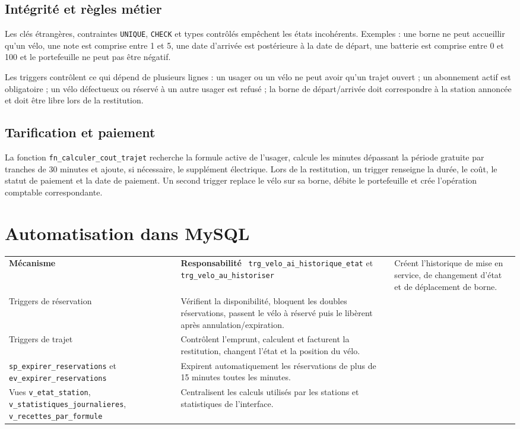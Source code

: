 \documentclass[11pt,a4paper]{article}
\begin{document}
\subsection{Intégrité et règles métier}
Les clés étrangères, contraintes \texttt{UNIQUE}, \texttt{CHECK} et types contrôlés empêchent les états incohérents. Exemples : une borne ne peut accueillir qu'un vélo, une note est comprise entre 1 et 5, une date d'arrivée est postérieure à la date de départ, une batterie est comprise entre 0 et 100 et le portefeuille ne peut pas être négatif.

Les triggers contrôlent ce qui dépend de plusieurs lignes : un usager ou un vélo ne peut avoir qu'un trajet ouvert ; un abonnement actif est obligatoire ; un vélo défectueux ou réservé à un autre usager est refusé ; la borne de départ/arrivée doit correspondre à la station annoncée et doit être libre lors de la restitution.

\subsection{Tarification et paiement}
La fonction \texttt{fn\_calculer\_cout\_trajet} recherche la formule active de l'usager, calcule les minutes dépassant la période gratuite par tranches de 30 minutes et ajoute, si nécessaire, le supplément électrique. Lors de la restitution, un trigger renseigne la durée, le coût, le statut de paiement et la date de paiement. Un second trigger replace le vélo sur sa borne, débite le portefeuille et crée l'opération comptable correspondante.

\section{Automatisation dans MySQL}
\begin{tabularx}{\textwidth}{p{}X}
\toprule
\textbf{Mécanisme} & \textbf{Responsabilité}\
\midrule
\texttt{trg\_velo\_ai\_historique\_etat} et \texttt{trg\_velo\_au\_historiser} & Créent l'historique de mise en service, de changement d'état et de déplacement de borne.\\
Triggers de réservation & Vérifient la disponibilité, bloquent les doubles réservations, passent le vélo à réservé puis le libèrent après annulation/expiration.\\
Triggers de trajet & Contrôlent l'emprunt, calculent et facturent la restitution, changent l'état et la position du vélo.\\
\texttt{sp\_expirer\_reservations} et \texttt{ev\_expirer\_reservations} & Expirent automatiquement les réservations de plus de 15 minutes toutes les minutes.\\
Vues \texttt{v\_etat\_station}, \texttt{v\_statistiques\_journalieres}, \texttt{v\_recettes\_par\_formule} & Centralisent les calculs utilisés par les stations et statistiques de l'interface.\\
\bottomrule
\end{tabularx}
\end{document}
